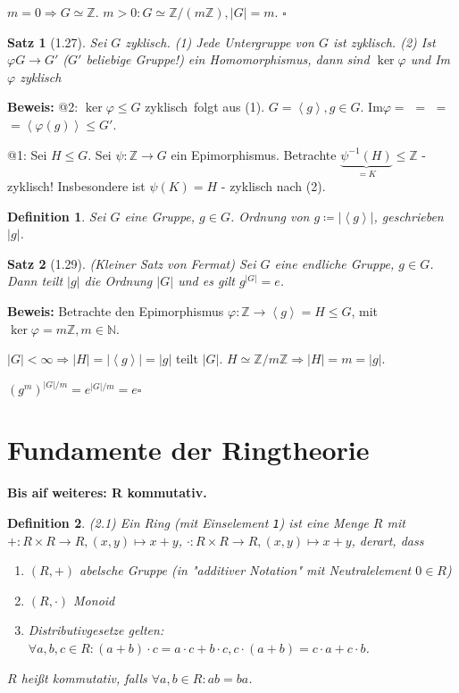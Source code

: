 \documentclass[10pt,a4paper]{article}
\newtheorem{defi}{Definition}
\newtheorem{satz}{Satz}
\begin{document}
$m=0 \Rightarrow G \simeq \mathbb{Z}$. $m > 0: G \simeq
\mathbb{Z} / (m \mathbb{Z}), \vert G \vert = m$. $\square$

\begin{satz}[1.27]
Sei $G$ zyklisch. (1) Jede Untergruppe von $G$ ist zyklisch. (2) Ist $\varphi G \to G'$ ($G'$ beliebige Gruppe!) ein Homomorphismus, dann sind $\ker \varphi$ und Im$\varphi$ zyklisch
\end{satz}
\textbf{Beweis:} @2: \glqq $\ker\varphi \leqslant G$ zyklisch\grqq\ folgt aus (1). $G = \left< g \right>, g \in G$. Im$\varphi =$   $=$  $=$  $= \left< \varphi(g) \right> \leqslant G'$.

@1: Sei $H \leq G$. Sei $\psi : \mathbb{Z} \to G$ ein Epimorphismus. Betrachte $\underbrace{\psi^{-1}(H)}_{= K} \leqslant \mathbb{Z}$ - zyklisch! Insbesondere ist $\psi(K) = H$ - zyklisch nach (2).

\begin{defi}
Sei $G$ eine Gruppe, $g \in G$. Ordnung von $g \coloneqq \vert \left< g \right> \vert$, geschrieben $\vert g \vert$.
\end{defi}

\begin{satz}[1.29](Kleiner Satz von Fermat)
Sei $G$ eine endliche Gruppe, $g \in G$. Dann teilt $\vert g \vert$ die Ordnung $\vert G \vert$ und es gilt $g^{\vert G \vert} = e$.
\end{satz}
\textbf{Beweis:} Betrachte den Epimorphismus $\varphi: \mathbb{Z} \to \left< g \right> = H \leqslant G$, mit $\ker \varphi = m \mathbb{Z}, m \in \mathbb{N}$.

$\vert G \vert < \infty \Rightarrow \vert H \vert = \vert \left< g \right> \vert = \vert g \vert$ teilt $\vert G \vert$. $H \simeq \mathbb{Z} / m\mathbb{Z} \Rightarrow \vert H \vert = m = \vert g \vert.$

$(g^m)^{\vert G \vert / m} = e^{\vert G \vert / m} = e \square$\bigskip

\section{Fundamente der Ringtheorie}

\textbf{Bis aif weiteres: R kommutativ.}

\begin{defi}(2.1)
Ein \emph{Ring} (mit Einselement \texttt{1}) ist eine Menge $R$ mit $+ : R \times R \to R, (x,y) \mapsto x + y$, $\cdot : R \times R \to R, (x,y) \mapsto x + y$, derart, dass
\begin{enumerate}
\item $(R,+)$ abelsche Gruppe (in "additiver Notation" mit Neutralelement $0 \in R$)
\item $(R, \cdot)$ Monoid
\item Distributivgesetze gelten: $\forall a,b,c \in R: (a+b) \cdot c = a  \cdot c + b \cdot c, c \cdot (a+b) = c \cdot a + c \cdot b$.
\end{enumerate}
$R$ heißt \emph{kommutativ}, falls $\forall a,b \in R: ab = ba$.
\end{defi}
\end{document}
